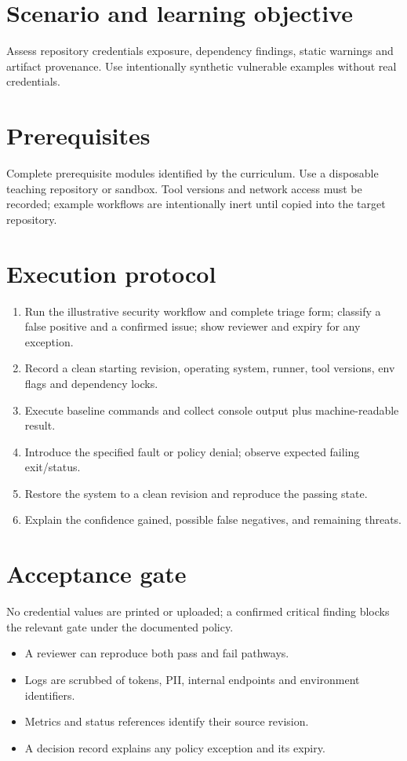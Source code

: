 \documentclass[11pt,letterpaper]{article}
\begin{document}
\makedoctitle
\makedocsummary
\tableofcontents
\clearpage
\section{Scenario and learning objective}
Assess repository credentials exposure, dependency findings, static warnings and artifact provenance. Use intentionally synthetic vulnerable examples without real credentials.

\section{Prerequisites}
Complete prerequisite modules identified by the curriculum. Use a disposable teaching repository or sandbox. Tool versions and network access must be recorded; example workflows are intentionally inert until copied into the target repository.

\section{Execution protocol}
\begin{enumerate}
\item Run the illustrative security workflow and complete triage form; classify a false positive and a confirmed issue; show reviewer and expiry for any exception.
\item Record a clean starting revision, operating system, runner, tool versions, env flags and dependency locks.
\item Execute baseline commands and collect console output plus machine-readable result.
\item Introduce the specified fault or policy denial; observe expected failing exit/status.
\item Restore the system to a clean revision and reproduce the passing state.
\item Explain the confidence gained, possible false negatives, and remaining threats.
\end{enumerate}
\section{Acceptance gate}
No credential values are printed or uploaded; a confirmed critical finding blocks the relevant gate under the documented policy.

\begin{itemize}
\item A reviewer can reproduce both pass and fail pathways.
\item Logs are scrubbed of tokens, PII, internal endpoints and environment identifiers.
\item Metrics and status references identify their source revision.
\item A decision record explains any policy exception and its expiry.
\end{itemize}
\end{document}
